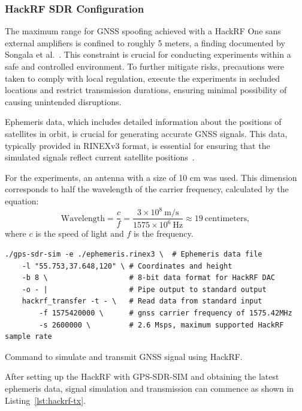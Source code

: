 \documentclass[12pt, a4paper]{extarticle}
\begin{document}
\subsubsection{HackRF SDR Configuration}\label{sec:hackrf}

The maximum range for GNSS spoofing achieved with a HackRF One sans external
amplifiers is confined to roughly 5 meters, a finding documented by Songala et
al.~\cite{hackrf-gnss-spoofing}. This constraint is crucial for conducting
experiments within a safe and controlled environment. To further mitigate
risks, precautions were taken to comply with local regulation, execute the
experiments in secluded locations and restrict transmission durations, ensuring
minimal possibility of causing unintended disruptions.

Ephemeris data, which includes detailed information about the positions of
satellites in orbit, is crucial for generating accurate GNSS signals. This
data, typically provided in RINEXv3 format, is essential for ensuring that the
simulated signals reflect current satellite positions~\cite{rinex-v3}.

For the experiments, an antenna with a size of 10 cm was used. This dimension
corresponds to half the wavelength of the carrier frequency, calculated by the
equation:
\[
    \text{Wavelength} = \frac{c}{f} = \frac{3\times 10^8\ \text{m/s}}{1575 \times 10^{6}\ \text{Hz}}
    \approx 19\ \text{centimeters},
\]
where \( c \) is the speed of light and \( f \) is the frequency.

\begin{listing}[!ht]
\begin{verbatim}
./gps-sdr-sim -e ./ephemeris.rinex3 \  # Ephemeris data file
    -l "55.753,37.648,120" \ # Coordinates and height
    -b 8 \                   # 8-bit data format for HackRF DAC
    -o - |                   # Pipe output to standard output
    hackrf_transfer -t - \   # Read data from standard input
        -f 1575420000 \      # gnss carrier frequency of 1575.42MHz
        -s 2600000 \         # 2.6 Msps, maximum supported HackRF sample rate
\end{verbatim}
\caption{Command to simulate and transmit GNSS signal using HackRF.}
\label{lst:hackrf-tx}
\end{listing}

After setting up the HackRF with GPS-SDR-SIM and obtaining the latest ephemeris
data, signal simulation and transmission can commence as shown in
Listing~\ref{lst:hackrf-tx}.
\end{document}
